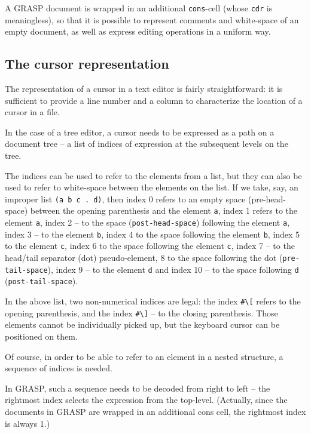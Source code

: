 \documentclass[sigconf]{acmart}
\begin{document}
A GRASP document is wrapped in an additional \texttt{cons}-cell
(whose \texttt{cdr} is meaningless), so that it is possible
to represent comments and white-space of an empty document,
as well as express editing operations in a uniform way.

\subsection{The cursor representation}

The representation of a cursor in a text editor is fairly
straightforward: it is sufficient to provide a line number
and a column to characterize the location of a cursor
in a file.

In the case of a tree editor, a cursor needs to be expressed
as a path on a document tree -- a list of indices
of expression at the subsequent levels on the tree.

The indices can be used to refer to the elements
from a list, but they can also be used to refer to
white-space between the elements on the list. If we take,
say, an improper list \texttt{(a b c . d)}, then index 0
refers to an empty space (pre-head-space) between 
the opening parenthesis and the element \texttt{a}, index 1 refers 
to the element \texttt{a}, index 2 -- to the space 
(\texttt{post-head-space})
following the element \texttt{a}, index 3 -- to the element 
\texttt{b},
index 4 to the space following the element \texttt{b},
index 5 to the element \texttt{c}, index 6 to the space following
the element \texttt{c}, index 7 -- to the head/tail 
separator (dot) pseudo-element, 8 to the space following the dot
(\texttt{pre-tail-space}), index 9 -- to the element \texttt{d}
and index 10 -- to the space following \texttt{d}
(\texttt{post-tail-space}).

In the above list, two non-numerical indices are legal:
the index \texttt{\#\textbackslash[} refers to the opening parenthesis,
and the index \texttt{\#\textbackslash]} -- to the closing parenthesis. Those
elements cannot be individually picked up, but the keyboard
cursor can be positioned on them.

Of course, in order to be able to refer to an element
in a nested structure, a sequence of indices is needed.

In GRASP, such a sequence needs to be decoded from right
to left -- the rightmost index selects the expression
from the top-level. (Actually, since the documents in
GRASP are wrapped in an additional cons cell, the rightmost
index is always 1.)
\end{document}
